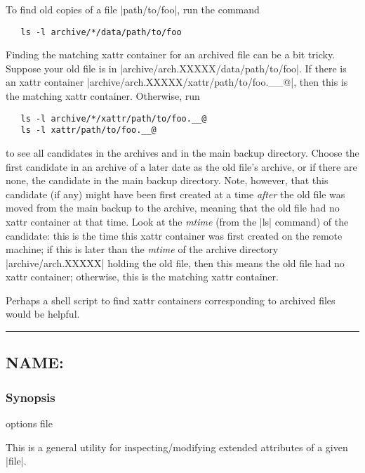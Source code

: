\documentclass[11pt]{article}
\def\sepline{\begin{center}\rule{5in}{1pt}\end{center}}
\newcommand\BackSlash{\char92}
\newcommand\LeftBrace{\char123}
\newcommand\RightBrace{\char125}
\newenvironment{Quote}{\let\\\BackSlash\let\{\LeftBrace\let\}\RightBrace}{}
\begin{document}
To find old copies of a file |path/to/foo|, run the command
\begin{Verbatim}
   ls -l archive/*/data/path/to/foo
\end{Verbatim}

Finding the matching xattr container for an archived file
can be a bit tricky.  
Suppose your old file is in |archive/arch.XXXXX/data/path/to/foo|.
If there is an xattr container |archive/arch.XXXXX/xattr/path/to/foo.__@|,
then this is the matching xattr container.
Otherwise,
run 
\begin{Verbatim}
   ls -l archive/*/xattr/path/to/foo.__@
   ls -l xattr/path/to/foo.__@
\end{Verbatim}
to see all candidates in the archives and in the main backup directory.
Choose the first candidate in an archive of a later
date as the old file's archive, or if there are none, the candidate in
the main backup directory.
Note, however, that this candidate (if any) might have been first
created at a time \emph{after} the old file was moved
from the main backup to the archive,
meaning that the old file had no xattr container at that time.
Look at the \emph{mtime} (from the |ls| command) of the candidate:
this is the time this xattr container was first created
on the remote machine;
if this is later than the \emph{mtime} of the archive directory
|archive/arch.XXXXX| holding the old file, then this means
the old file had no xattr container; otherwise, this is
the matching xattr container.

Perhaps a shell script to find xattr containers corresponding to
archived files would be helpful.





\sepline


\subsection*{NAME: \tt{}}

\subsubsection*{Synopsis}

\begin{Quote}
\begin{Vrb}
    options file
\end{Vrb}
\end{Quote}

This is a general utility for inspecting/modifying extended attributes
of a given |file|.
\end{document}
